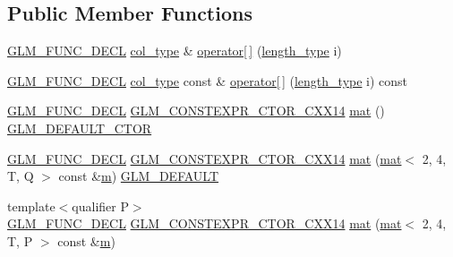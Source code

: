 \subsection*{Public Member Functions}
\begin{DoxyCompactItemize}
\item 
\mbox{\hyperlink{setup_8hpp_ab2d052de21a70539923e9bcbf6e83a51}{G\+L\+M\+\_\+\+F\+U\+N\+C\+\_\+\+D\+E\+CL}} \mbox{\hyperlink{structglm_1_1mat_3_012_00_014_00_01_t_00_01_q_01_4_ae14ad10a9d8ce3908ec89ae373a27872}{col\+\_\+type}} \& \mbox{\hyperlink{structglm_1_1mat_3_012_00_014_00_01_t_00_01_q_01_4_a30332bf17d9c1668fcdc80e301cfe118}{operator\mbox{[}$\,$\mbox{]}}} (\mbox{\hyperlink{structglm_1_1mat_3_012_00_014_00_01_t_00_01_q_01_4_a5295c484627e965d615f3367c2ca45d8}{length\+\_\+type}} i)
\item 
\mbox{\hyperlink{setup_8hpp_ab2d052de21a70539923e9bcbf6e83a51}{G\+L\+M\+\_\+\+F\+U\+N\+C\+\_\+\+D\+E\+CL}} \mbox{\hyperlink{structglm_1_1mat_3_012_00_014_00_01_t_00_01_q_01_4_ae14ad10a9d8ce3908ec89ae373a27872}{col\+\_\+type}} const  \& \mbox{\hyperlink{structglm_1_1mat_3_012_00_014_00_01_t_00_01_q_01_4_af5ccda8342646f7dea9fec3ed9088607}{operator\mbox{[}$\,$\mbox{]}}} (\mbox{\hyperlink{structglm_1_1mat_3_012_00_014_00_01_t_00_01_q_01_4_a5295c484627e965d615f3367c2ca45d8}{length\+\_\+type}} i) const
\item 
\mbox{\hyperlink{setup_8hpp_ab2d052de21a70539923e9bcbf6e83a51}{G\+L\+M\+\_\+\+F\+U\+N\+C\+\_\+\+D\+E\+CL}} \mbox{\hyperlink{setup_8hpp_a0900f9145e68bf6061b6f5e7be3fa751}{G\+L\+M\+\_\+\+C\+O\+N\+S\+T\+E\+X\+P\+R\+\_\+\+C\+T\+O\+R\+\_\+\+C\+X\+X14}} \mbox{\hyperlink{structglm_1_1mat_3_012_00_014_00_01_t_00_01_q_01_4_a7fc67ba4ee21331632e9da37cec2a96e}{mat}} () \mbox{\hyperlink{setup_8hpp_afb97a4e995bc004c0cbbfa22125b80ba}{G\+L\+M\+\_\+\+D\+E\+F\+A\+U\+L\+T\+\_\+\+C\+T\+OR}}
\item 
\mbox{\hyperlink{setup_8hpp_ab2d052de21a70539923e9bcbf6e83a51}{G\+L\+M\+\_\+\+F\+U\+N\+C\+\_\+\+D\+E\+CL}} \mbox{\hyperlink{setup_8hpp_a0900f9145e68bf6061b6f5e7be3fa751}{G\+L\+M\+\_\+\+C\+O\+N\+S\+T\+E\+X\+P\+R\+\_\+\+C\+T\+O\+R\+\_\+\+C\+X\+X14}} \mbox{\hyperlink{structglm_1_1mat_3_012_00_014_00_01_t_00_01_q_01_4_a78af7c89ef6af64cc6c24b6764a3099c}{mat}} (\mbox{\hyperlink{structglm_1_1mat}{mat}}$<$ 2, 4, T, Q $>$ const \&\mbox{\hyperlink{_s_d_l__opengl__glext_8h_af593500c283bf1a787a6f947f503a5c2}{m}}) \mbox{\hyperlink{setup_8hpp_aefce7051c376a64ba89fa93a9f63bc2c}{G\+L\+M\+\_\+\+D\+E\+F\+A\+U\+LT}}
\item 
{\footnotesize template$<$qualifier P$>$ }\\\mbox{\hyperlink{setup_8hpp_ab2d052de21a70539923e9bcbf6e83a51}{G\+L\+M\+\_\+\+F\+U\+N\+C\+\_\+\+D\+E\+CL}} \mbox{\hyperlink{setup_8hpp_a0900f9145e68bf6061b6f5e7be3fa751}{G\+L\+M\+\_\+\+C\+O\+N\+S\+T\+E\+X\+P\+R\+\_\+\+C\+T\+O\+R\+\_\+\+C\+X\+X14}} \mbox{\hyperlink{structglm_1_1mat_3_012_00_014_00_01_t_00_01_q_01_4_a5401c74b80f80ee197c8e83e3003cfe9}{mat}} (\mbox{\hyperlink{structglm_1_1mat}{mat}}$<$ 2, 4, T, P $>$ const \&\mbox{\hyperlink{_s_d_l__opengl__glext_8h_af593500c283bf1a787a6f947f503a5c2}{m}})

\end{DoxyCompactItemize}
